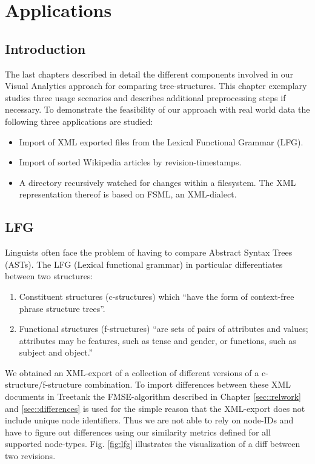 \section{Applications}\label{sec::applications}
\subsection{Introduction}
The last chapters described in detail the different components involved in our Visual Analytics approach for comparing tree-structures. This chapter exemplary studies three usage scenarios and describes additional preprocessing steps if necessary. To demonstrate the feasibility of our approach with real world data the following three applications are studied:

\begin{itemize}
\item Import of XML exported files from the Lexical Functional Grammar (LFG).
\item Import of sorted Wikipedia articles by revision-timestamps. 
\item A directory recursively watched for changes within a filesystem. The XML representation thereof is based on FSML\cite{FSML}, an XML-dialect. 
\end{itemize}

\subsection{LFG}
Linguists often face the problem of having to compare Abstract Syntax Trees (ASTs). The LFG (Lexical functional grammar) in particular differentiates between two structures:

\begin{enumerate}
\item{Constituent structures (c-structures)} which ``have the form of context-free phrase structure trees''.
\item{Functional structures (f-structures)} ``are sets of pairs of attributes and values; attributes may be features, such as tense and gender, or functions, such as subject and object.''\cite{LFG}
\end{enumerate}

We obtained an XML-export of a collection of different versions of a c-structure/f-structure combination. To import differences between these XML documents in Treetank the FMSE-algorithm described in Chapter \ref{sec::relwork} and \ref{sec::differences} is used for the simple reason that the XML-export does not include unique node identifiers. Thus we are not able to rely on node-IDs and have to figure out differences using our similarity metrics defined for all supported node-types. Fig. \ref{fig:lfg} illustrates the visualization of a diff between two revisions.

